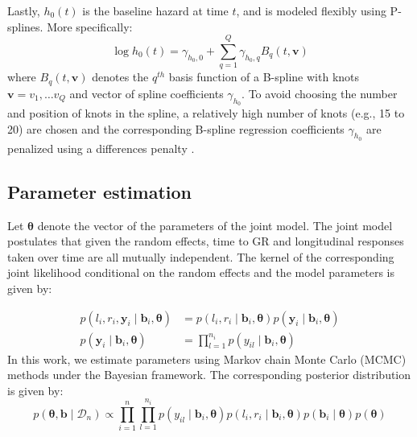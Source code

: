 Lastly, $h_0(t)$ is the baseline hazard at time $t$, and is modeled flexibly using P-splines. More specifically:
\begin{equation*}
\log{h_0(t)} = \gamma_{h_0,0} + \sum_{q=1}^Q \gamma_{h_0,q} B_q(t, \boldsymbol{v})
\end{equation*}
where $B_q(t, \boldsymbol{v})$ denotes the $q^{th}$ basis function of a B-spline with knots $\boldsymbol{v} = v_1, \ldots v_Q$ and vector of spline coefficients $\gamma_{h_0}$. To avoid choosing the number and position of knots in the spline, a relatively high number of knots (e.g., 15 to 20) are chosen and the corresponding B-spline regression coefficients $\gamma_{h_0}$ are penalized using a differences penalty \citep{eilers1996flexible}.

\subsection{Parameter estimation}
Let $\boldsymbol{\theta}$ denote the vector of the parameters of the joint model. The joint model postulates that given the random effects, time to GR and longitudinal responses taken over time are all mutually independent. The kernel of the corresponding joint likelihood conditional on the random effects and the model parameters is given by:

\begin{align*}
p(l_i, r_i, \boldsymbol{y}_i \mid \boldsymbol{b}_i, \boldsymbol{\theta}) &= p(l_i, r_i \mid \boldsymbol{b}_i, \boldsymbol{\theta}) p(\boldsymbol{y}_i \mid \boldsymbol{b}_i, \boldsymbol{\theta})\\
p(\boldsymbol{y}_i \mid \boldsymbol{b}_i, \boldsymbol{\theta}) &= \prod_{l=1}^{n_i} p(y_{il} \mid \boldsymbol{b}_i, \boldsymbol{\theta})
\end{align*}
In this work, we estimate parameters using Markov chain Monte Carlo (MCMC) methods under the Bayesian framework. The corresponding posterior distribution is given by:
\begin{equation*}
p(\boldsymbol{\theta}, \boldsymbol{b} \mid \mathcal{D}_n) \propto \prod_{i=1}^n  \prod_{l=1}^{n_i} p(y_{il} \mid \boldsymbol{b}_i, \boldsymbol{\theta}) p(l_i, r_i \mid \boldsymbol{b}_i, \boldsymbol{\theta})  p(\boldsymbol{b}_i \mid \boldsymbol{\theta}) p(\boldsymbol{\theta})
\end{equation*}